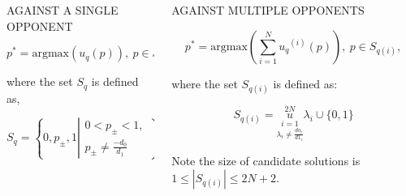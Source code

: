 \documentclass[usenames,dvipsnames,t]{beamer}
\begin{document}
\begin{columns}
    \begin{column}{.4\linewidth}
        \centering
        \textcolor{solarizedOrange}{\large{AGAINST A SINGLE OPPONENT}}
        \vspace{.3cm}

        \begin{minipage}{50cm}
        \begin{block}

            \[p^* = \text{argmax}(u_q(p)), \ p \in S_q,\]
            \vspace{0.3cm}

            \small{
            where the set \(S_q\) is defined as,}
        
            \[S_q = \left \{0, p_{\pm}, 1 \left | \begin{array}{l} 0 < p_{\pm} < 1,
            \\ p_{\pm} \neq \frac{-d_0}{d_1} \end{array} \right. \right\}\]
        \end{block}
    \end{minipage}
    \vspace{0.3cm}

    
    \end{column}
    \begin{column}{.4\linewidth}
        \centering
        \textcolor{solarizedYellow}{\large{AGAINST MULTIPLE OPPONENTS}}
        \vspace{.3cm}

        \begin{minipage}{50cm}
            \begin{block}

            \[p^* = \text{argmax}(\displaystyle \sum_{i=1} ^ {N} {u_q}^{(i)} (p)), \ p \in S_{q(i)},\]
            \vspace{0.3cm}

            \small{
            where the set \(S_{q(i)}\) is defined as:}

            \[ S_{q(i)} =  \overset{2N}{\underset{\lambda_i \neq \frac{do_i}{d1_i}}{\underset{i=1}{u}}} \lambda_i \cup \{0, 1\} \]
             \vspace{0.3cm}

            Note the size of candidate solutions is \( 1 \leq|S_{q(i)}| \leq 2N + 2\).
            \end{block}
        \end{minipage}
        \vspace{.3cm}


\end{column}
\end{columns}
\end{document}
